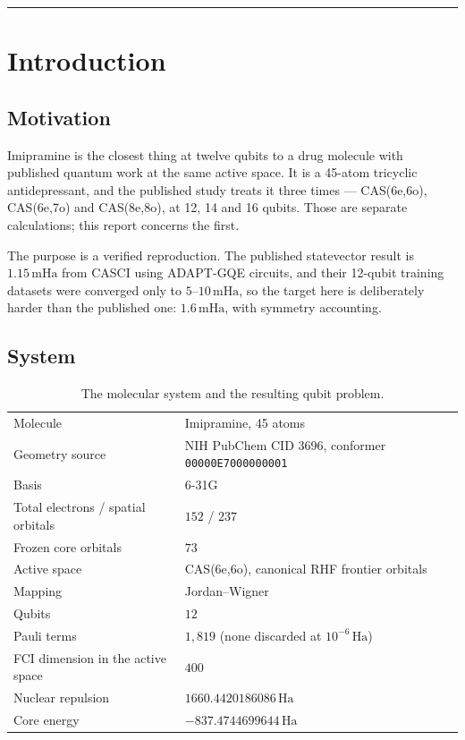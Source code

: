 \documentclass[11pt,a4paper]{article}
\newcommand{\mHa}{\ensuremath{\,\mathrm{mHa}}}
\newcommand{\Ha}{\ensuremath{\,\mathrm{Ha}}}
\newcommand{\code}[1]{\texttt{\small #1}}
\begin{document}
\tableofcontents
\vspace{0.6em}
\hrule
\vspace{0.8em}

\section{Introduction}

\subsection{Motivation}

Imipramine is the closest thing at twelve qubits to a drug molecule with
published quantum work at the same active space. It is a 45-atom tricyclic
antidepressant, and the published study treats it three times --- CAS(6e,6o),
CAS(6e,7o) and CAS(8e,8o), at 12, 14 and 16 qubits. Those are separate
calculations; this report concerns the first.

The purpose is a verified reproduction. The published statevector result is
$1.15\mHa$ from CASCI using ADAPT-GQE circuits, and their 12-qubit training
datasets were converged only to $5$--$10\mHa$, so the target here is
deliberately harder than the published one: $1.6\mHa$, with symmetry accounting.

\subsection{System}

\begin{table}[htbp]
\centering
\caption{The molecular system and the resulting qubit problem.}
\label{tab:system}
\small
\begin{tabular}{ll}
\toprule
Molecule & Imipramine, 45 atoms \\
Geometry source & NIH PubChem CID 3696, conformer \code{00000E7000000001} \\
Basis & 6-31G \\
Total electrons / spatial orbitals & $152$ / $237$ \\
Frozen core orbitals & $73$ \\
Active space & CAS(6e,6o), canonical RHF frontier orbitals \\
Mapping & Jordan--Wigner \\
Qubits & $12$ \\
Pauli terms & $1{,}819$ (none discarded at $10^{-6}\Ha$) \\
FCI dimension in the active space & $400$ \\
Nuclear repulsion & $1660.4420186086\Ha$ \\
Core energy & $-837.4744699644\Ha$ \\
\bottomrule
\end{tabular}
\end{table}
\end{document}

